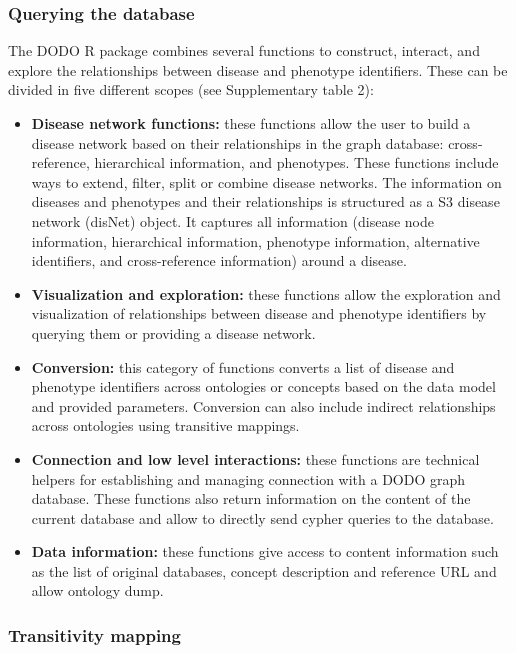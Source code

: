 \documentclass[9pt,a4paper,]{extarticle}
\begin{document}
\hypertarget{querying-the-database}{%
\subsubsection{Querying the database}\label{querying-the-database}}

The DODO R package combines several functions to construct, interact, and explore the relationships between disease and phenotype identifiers. These can be divided in five different scopes (see Supplementary table 2):

\begin{itemize}
\item
  \textbf{Disease network functions:} these functions allow the user to build a disease network based on their relationships in the graph database: cross-reference, hierarchical information, and phenotypes. These functions include ways to extend, filter, split or combine disease networks. The information on diseases and phenotypes and their relationships is structured as a S3 disease network (disNet) object. It captures all information (disease node information, hierarchical information, phenotype information, alternative identifiers, and cross-reference information) around a disease.
\item
  \textbf{Visualization and exploration:} these functions allow the exploration and visualization of relationships between disease and phenotype identifiers by querying them or providing a disease network.
\item
  \textbf{Conversion:} this category of functions converts a list of disease and phenotype identifiers across ontologies or concepts based on the data model and provided parameters. Conversion can also include indirect relationships across ontologies using transitive mappings.
\item
  \textbf{Connection and low level interactions:} these functions are technical helpers for establishing and managing connection with a DODO graph database. These functions also return information on the content of the current database and allow to directly send cypher queries to the database.
\item
  \textbf{Data information:} these functions give access to content information such as the list of original databases, concept description and reference URL and allow ontology dump.
\end{itemize}

\hypertarget{transitivity-mapping}{%
\subsubsection{Transitivity mapping}\label{transitivity-mapping}}
\end{document}
